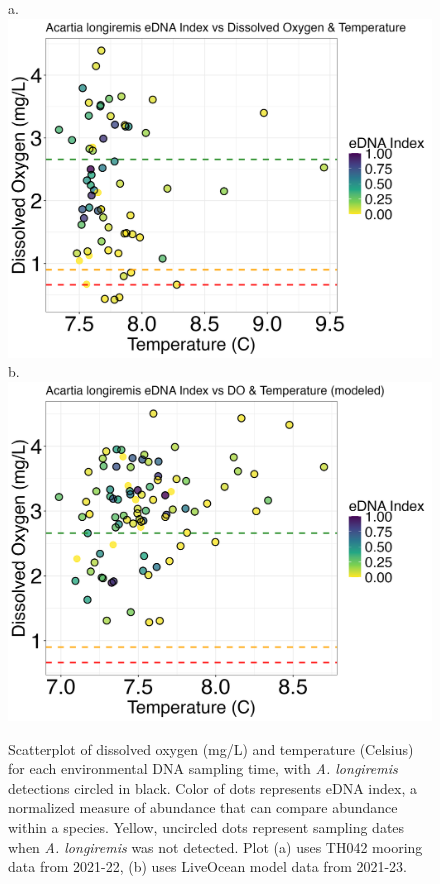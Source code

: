 \documentclass[12pt,twoside]{reedthesis}
\begin{document}
	\begin{figure}[!h]
		\begin{center}
			a. \includegraphics[scale=0.3]{Alongiremis_Scatter_noOut}
			b. \includegraphics[scale=0.3]{Alongiremis_Scatter_AllYr_mod_noOut}
			\caption[\textit{A. longiremis} scatterplot]{\footnotesize{Scatterplot of dissolved oxygen (mg/L) and temperature (Celsius) for each environmental DNA sampling time, with \textit{A. longiremis} detections circled in black. Color of dots represents eDNA index, a normalized measure of abundance that can compare abundance within a species. Yellow, uncircled dots represent sampling dates when \textit{A. longiremis} was not detected. Plot (a) uses TH042 mooring data from 2021-22, (b) uses LiveOcean model data from 2021-23.}} %
			\label{AlongiremisScatter}
		\end{center}
	\end{figure} 
	
\end{document}
